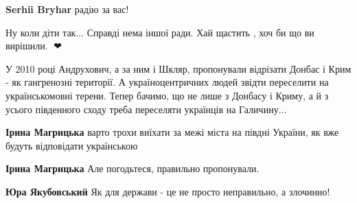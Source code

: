 \begin{itemize}
\begin{itemize}
\textbf{Serhii Bryhar} радію за вас!
\end{itemize}

 
Ну коли діти так... Справді нема іншої ради. Хай щастить , хоч би що ви
вирішили. 💓❤


 

У 2010 році Андрухович, а за ним і Шкляр, пропонували відрізати Донбас і Крим -
як гангренозні території. А україноцентричних людей звідти переселити на
українськомовні терени. Тепер бачимо, що не лише з Донбасу і Криму, а й з
усього південного сходу треба переселяти українців на Галичину...

\begin{itemize}
 
\textbf{Ірина Магрицька} варто трохи виїхати за межі міста на півдні України, як вже будуть відповідати українською

 
\textbf{Ірина Магрицька} Але погодьтеся, правильно пропонували.

 
\textbf{Юра Якубовський} Як для держави - це не просто неправильно, а злочинно!

 

\end{itemize}
\end{itemize}
